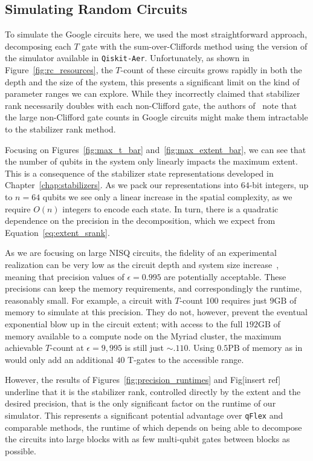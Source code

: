 \subsection{Simulating Random Circuits}
To simulate the Google circuits here, we used the most straightforward approach, decomposing each $T$ gate with the sum-over-Cliffords method using the version of the simulator available in \texttt{Qiskit-Aer}. Unfortunately, as shown in Figure~\ref{fig:rc_resources}, the $T$-count of these circuits grows rapidly in both the depth and the size of the system, this presents a significant limit on the kind of parameter ranges we can explore. While they incorrectly claimed that stabilizer rank necessarily doubles with each non-Clifford gate, the authors of~\cite{Villalonga2019} note that the large non-Clifford gate counts in Google circuits might make them intractable to the stabilizer rank method.\par
Focusing on Figures~\ref{fig:max_t_bar} and~\ref{fig:max_extent_bar}, we can see that the number of qubits in the system only linearly impacts the maximum extent. This is a consequence of the stabilizer state representations developed in Chapter~\ref{chap:stabilizers}. As we pack our representations into $64$-bit integers, up to $n=64$ qubits we see only a linear increase in the spatial complexity, as we require $O(n)$ integers to encode each state. In turn, there is a quadratic dependence on the precision in the decomposition, which we expect from Equation~\ref{eq:extent_srank}.\par
As we are focusing on large NISQ circuits, the fidelity of an experimental realization can be very low as the circuit depth and system size increase~\cite{Villalonga2018,Villalonga2019}, meaning that precision values of $\epsilon=0.995$ are potentially acceptable. These precisions can keep the memory requirements, and correspondingly the runtime, reasonably small. For example, a circuit with $T$-count 100 requires just $9\mathrm{GB}$ of memory to simulate at this precision. They do not, however, prevent the eventual exponential blow up in the circuit extent; with access to the full $192\mathrm{GB}$ of memory available to a compute node on the Myriad cluster, the maximum achievable $T$-count at $\epsilon=9,995$ is still just $\sim. 110$. Using $0.5\mathrm{PB}$ of memory as in~\cite{Villalonga2019} would only add an additional $40$ T-gates to the accessible range.\par
However, the results of Figures~\ref{fig:precision_runtimes} and Fig[insert ref] underline that it is the stabilizer rank, controlled directly by the extent and the desired precision, that is the only significant factor on the runtime of our simulator. This represents a significant potential advantage over \texttt{qFlex} and comparable methods, the runtime of which depends on being able to decompose the circuits into large blocks with as few multi-qubit gates between blocks as possible.\par
